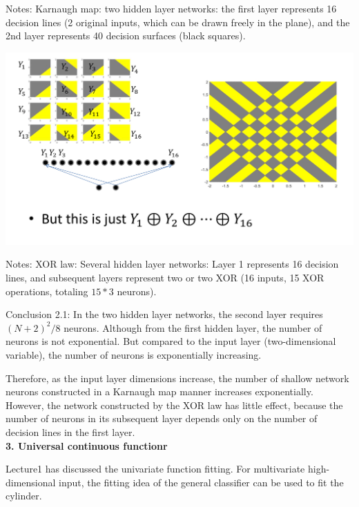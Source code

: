 \documentclass{article}
\begin{document}
	Notes: Karnaugh map: two hidden layer networks: the first layer represents 16 decision lines (2 original inputs, which can be drawn freely in the plane), and the 2nd layer represents 40 decision surfaces (black squares).
	
	
	\includegraphics[scale=0.2]{32.png}
	
	Notes: XOR law: Several hidden layer networks: Layer 1 represents 16 decision lines, and subsequent layers represent two or two XOR (16 inputs, 15 XOR operations, totaling $15*3$ neurons). 
	
	Conclusion 2.1: In the two hidden layer networks, the second layer requires $(N+2)^2/8$ neurons. Although from the first hidden layer, the number of neurons is not exponential. But compared to the input layer (two-dimensional variable), the number of neurons is exponentially increasing.
	
	Therefore, as the input layer dimensions increase, the number of shallow network neurons constructed in a Karnaugh map manner increases exponentially. However, the network constructed by the XOR law has little effect, because the number of neurons in its subsequent layer depends only on the number of decision lines in the first layer. \\
	
	\textbf{3. Universal continuous functionr}
	
	Lecture1 has discussed the univariate function fitting. For multivariate high-dimensional input, the fitting idea of the general classifier can be used to fit the cylinder. \\  \\ \\ \\ \\ \\
	
\end{document}
